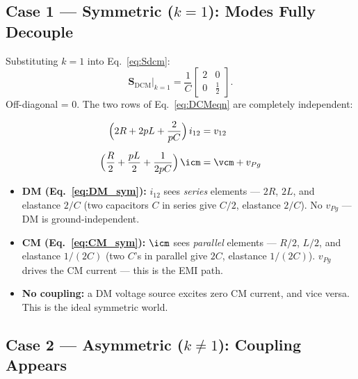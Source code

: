 \subsection{Case 1 — Symmetric ($k = 1$): Modes Fully Decouple}

Substituting $k = 1$ into Eq.~\eqref{eq:Sdcm}:
\[
\mathbf{S}_{\mathrm{DCM}}\big|_{k=1}
=
\frac{1}{C}\begin{bmatrix}2 & 0 \\ 0 & \tfrac{1}{2}\end{bmatrix}.
\]
Off-diagonal = 0.  The two rows of Eq.~\eqref{eq:DCMeqn} are
completely independent:

\begin{eqnbox}
\begin{align}
    \Bigl(2R + 2pL + \frac{2}{pC}\Bigr)\,i_{12}
        &= v_{12}
        \label{eq:DM_sym} \\[6pt]
    \Bigl(\frac{R}{2} + \frac{pL}{2} + \frac{1}{2pC}\Bigr)\,\icm
        &= \vcm + v_{Pg}
        \label{eq:CM_sym}
\end{align}
\end{eqnbox}

\begin{circuitbox}
\begin{itemize}
    \item \textbf{DM (Eq.~\ref{eq:DM_sym}):} $i_{12}$ sees
          \emph{series} elements — $2R$, $2L$, and elastance $2/C$
          (two capacitors $C$ in series give $C/2$, elastance $2/C$).
          No $v_{Pg}$ — DM is ground-independent.
    \item \textbf{CM (Eq.~\ref{eq:CM_sym}):} $\icm$ sees
          \emph{parallel} elements — $R/2$, $L/2$, and elastance
          $1/(2C)$ (two $C$'s in parallel give $2C$, elastance $1/(2C)$).
          $v_{Pg}$ drives the CM current — this is the EMI path.
    \item \textbf{No coupling:} a DM voltage source excites zero CM
          current, and vice versa.  This is the ideal symmetric world.
\end{itemize}
\end{circuitbox}

\subsection{Case 2 — Asymmetric ($k \neq 1$): Coupling Appears}

